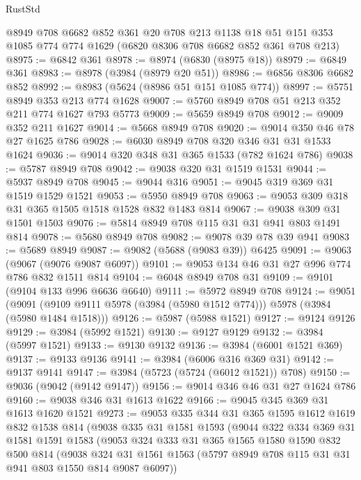 \begin{lexlean}{RustStd}
\begin{coremodule}
    @8949
    @708
    @6682
    @852
    @361
    @20
    @708
    @213
    @1138
    @18
    @51
    @151
    @353
    @1085
    @774
    @774
    @1629
    (@6820 @8306 @708 @6682 @852 @361 @708 @213)
@8975 := @6842 @361
@8978 := @8974 (@6830 (@8975 @18))
@8979 := @6849 @361
@8983 := @8978 (@3984 (@8979 @20 @51))
@8986 := @6856 @8306 @6682 @852
@8992 := @8983 (@5624 (@8986 @51 @151 @1085 @774))
@8997 := @5751 @8949 @353 @213 @774 @1628
@9007 := @5760 @8949 @708 @51 @213 @352 @211 @774 @1627 @793 @5773
@9009 := @5659 @8949 @708
@9012 := @9009 @352 @211 @1627
@9014 := @5668 @8949 @708
@9020 := @9014 @350 @46 @78 @27 @1625 @786
@9028 := @6030 @8949 @708 @320 @346 @31 @31 @1533 @1624
@9036 := @9014 @320 @348 @31 @365 @1533 (@782 @1624 @786)
@9038 := @5787 @8949 @708
@9042 := @9038 @320 @31 @1519 @1531
@9044 := @5937 @8949 @708
@9045 := @9044 @316
@9051 := @9045 @319 @369 @31 @1519 @1529 @1521
@9053 := @5950 @8949 @708
@9063 := @9053 @309 @318 @31 @365 @1505 @1518 @1528 @832 @1483 @814
@9067 := @9038 @309 @31 @1501 @1503
@9076 := @5814 @8949 @708 @115 @31 @31 @941 @803 @1491 @814
@9078 := @5680 @8949 @708
@9082 := @9078 @39 @78 @39 @941
@9083 := @5689 @8949
@9087 := @9082 (@5688 (@9083 @39)) @6425
@9091 := @9063 (@9067 (@9076 @9087 @6097))
@9101 := @9053 @134 @46 @31 @27 @996 @774 @786 @832 @1511 @814
@9104 := @6048 @8949 @708 @31
@9109 := @9101 (@9104 @133 @996 @6636 @6640)
@9111 := @5972 @8949 @708
@9124 := @9051
    (@9091 (@9109 @9111 @5978 (@3984 (@5980 @1512 @774))) @5978 (@3984 (@5980 @1484 @1518)))
@9126 := @5987 (@5988 @1521)
@9127 := @9124 @9126
@9129 := @3984 (@5992 @1521)
@9130 := @9127 @9129
@9132 := @3984 (@5997 @1521)
@9133 := @9130 @9132
@9136 := @3984 (@6001 @1521 @369)
@9137 := @9133 @9136
@9141 := @3984 (@6006 @316 @369 @31)
@9142 := @9137 @9141
@9147 := @3984 (@5723 (@5724 (@6012 @1521)) @708)
@9150 := @9036 (@9042 (@9142 @9147))
@9156 := @9014 @346 @46 @31 @27 @1624 @786
@9160 := @9038 @346 @31 @1613 @1622
@9166 := @9045 @345 @369 @31 @1613 @1620 @1521
@9273 := @9053
    @335
    @344
    @31
    @365
    @1595
    @1612
    @1619
    @832
    @1538
    @814
    (@9038
      @335
      @31
      @1581
      @1593
      (@9044
        @322
        @334
        @369
        @31
        @1581
        @1591
        @1583
        (@9053
          @324
          @333
          @31
          @365
          @1565
          @1580
          @1590
          @832
          @500
          @814
          (@9038
            @324
            @31
            @1561
            @1563
            (@5797 @8949 @708 @115 @31 @31 @941 @803 @1550 @814 @9087 @6097))

\end{coremodule}
\end{lexlean}
